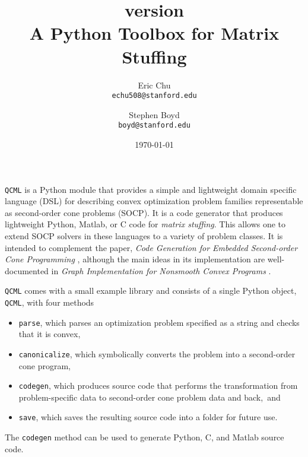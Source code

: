 \documentclass[11pt]{article}
\title{\qcml version \qcmlver \\
A Python Toolbox for Matrix Stuffing}
\author{
Eric Chu\\\texttt{echu508@stanford.edu}
\and
Stephen Boyd\\\texttt{boyd@stanford.edu}
}
\date{\today}
\def\qcml{\texttt{QCML}\xspace}
\begin{document}
  \maketitle
  
\qcml is a Python module that provides a simple and lightweight domain
specific language (DSL) for describing convex optimization problem families
representable as second-order cone problems (SOCP). It is a code generator
that produces lightweight Python, Matlab, or C code for \emph{matrix
stuffing}. This allows one to extend SOCP solvers in these languages to a 
variety of problem classes. It is intended to complement the paper, 
\emph{Code Generation for Embedded Second-order Cone Programming} \cite{CPD:13}, 
although the main ideas in its
implementation are well-documented in \emph{Graph Implementation for Nonsmooth Convex Programs}
\cite{GB:08}.

\qcml comes with a small example library and consists of a single Python
object, \texttt{QCML}, with four methods
\begin{itemize}
\item {\tt parse}, which parses an optimization problem specified as a
string and checks that it is convex,
\item {\tt canonicalize}, which symbolically converts the problem into
a second-order cone program,
\item {\tt codegen}, which produces source code that performs the
transformation from problem-specific data to second-order cone problem data
and back,~and
\item {\tt save}, which saves the resulting source code into a folder for
future use.
\end{itemize}
The \texttt{codegen} method can be used to generate Python, C, and Matlab
source code.
\end{document}
